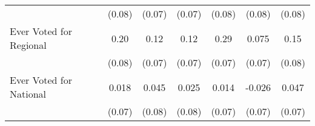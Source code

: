 {\begin{tabular}{l*{6}{c}}
            &      (0.08)         &      (0.07)         &      (0.07)         &      (0.08)         &      (0.08)         &      (0.08)         \\
\addlinespace
Ever Voted for Regional&        0.20\sym{**} &        0.12         &        0.12         &        0.29\sym{***}&       0.075         &        0.15         \\
            &      (0.08)         &      (0.07)         &      (0.07)         &      (0.07)         &      (0.07)         &      (0.08)         \\
\addlinespace
Ever Voted for National&       0.018         &       0.045         &       0.025         &       0.014         &      -0.026         &       0.047         \\
            &      (0.07)         &      (0.08)         &      (0.08)         &      (0.07)         &      (0.07)         &      (0.07)         \\
\bottomrule
\end{tabular}
}
